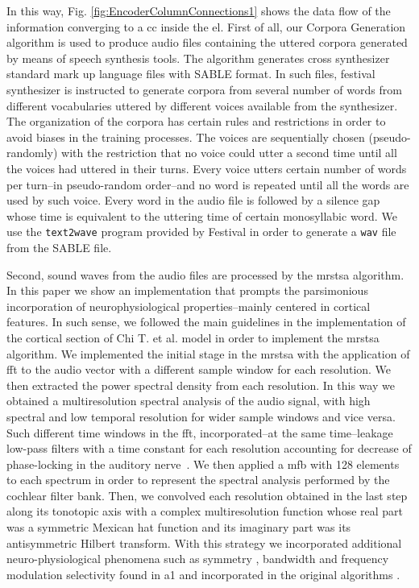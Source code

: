 {In this way, Fig. \ref{fig:EncoderColumnConnections1} shows the data flow of the information converging to a \gls{cc} inside the \gls{el}. First of all, our Corpora Generation algorithm is used to produce audio files containing the uttered corpora generated by means of speech synthesis tools. The algorithm generates cross synthesizer standard mark up language files with SABLE \cite{sable} format. In such files, \gls{festival} synthesizer is instructed to generate corpora from several number of words from different vocabularies uttered by different voices available from the synthesizer. The organization of the corpora has certain rules and restrictions in order to avoid biases in the training processes. The voices are sequentially chosen (pseudo-randomly) with the restriction that no voice could utter a second time until all the voices had uttered in their turns. Every voice utters certain number of words per turn--in pseudo-random order--and no word is repeated until all the words are used by such voice. Every word in the audio file is followed by a silence gap whose time is equivalent to the uttering time of certain monosyllabic word. We use the \texttt{text2wave} program provided by Festival in order to generate a \texttt{wav} file from the SABLE file.

Second, sound waves from the audio files are processed by the \gls{mrstsa} algorithm. In this paper we show an implementation that prompts the parsimonious incorporation of neurophysiological properties--mainly centered in cortical features. In such sense, we followed the main guidelines in the implementation of the cortical section of Chi T. et al. \cite{chi_2005} model in order to implement the \gls{mrstsa} algorithm. We implemented the initial stage in the \gls{mrstsa} with the application of \gls{fft} to the audio vector with a different sample window for each resolution. We then extracted the power spectral density from each resolution. In this way we obtained a multiresolution spectral analysis of the audio signal, with high spectral and low temporal resolution for wider sample windows and vice versa. Such different time windows in the \gls{fft}, incorporated--at the same time--leakage low-pass filters with a time constant for each resolution accounting for decrease of phase-locking in the auditory nerve~\cite{chi_2005}. We then applied a \gls{mfb} with 128 elements to each spectrum in order to represent the spectral analysis performed by the cochlear filter bank. Then, we convolved each resolution obtained in the last step along its tonotopic axis with a complex multiresolution function whose real part was a symmetric Mexican hat function and its imaginary part was its antisymmetric Hilbert transform. With this strategy we incorporated additional neuro-physiological phenomena such as symmetry \cite{shamma_1993}, bandwidth \cite{schreiner_1990} and frequency modulation selectivity \cite{shamma_1993,heil_1992,mendelson_1985} found in \gls{a1} and incorporated in the original algorithms \cite{wang_1995}.

}
